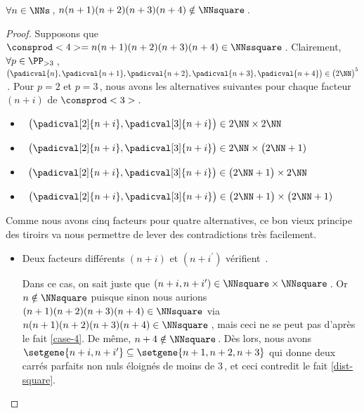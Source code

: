 \begin{fact} \label{case-5}
	 $\forall n \in \NNs$\,, $n(n+1)(n+2)(n+3)(n+4) \notin \NNsquare$\,.
\end{fact}




\begin{proof}
    Supposons que $\consprod<4> = n(n+1)(n+2)(n+3)(n+4) \in \NNssquare$\,.
    Clairement, $\forall p \in \PP_{>3}$\,, 
    $\big( \padicval{n} , \padicval{n + 1} , \padicval{n + 2} , \padicval{n + 3} , \padicval{n + 4} \big) \in \big( 2 \NN \big)^5$\,.
    Pour $p = 2$ et $p = 3$\,, nous avons les alternatives suivantes pour chaque facteur $(n+i)$ de $\consprod<3>$\,.
    \begin{itemize}
    	\smallskip
		\item {}\,
		$\big( \padicval[2]{n + i} , \padicval[3]{n + i} \big) \in 2 \NN \times 2 \NN$

    	\smallskip
		\item {}\,
		$\big( \padicval[2]{n + i} , \padicval[3]{n + i} \big) \in 2 \NN \times \big( 2 \NN + 1)$

    	\smallskip
		\item {}\,
		$\big( \padicval[2]{n + i} , \padicval[3]{n + i} \big) \in \big( 2 \NN + 1 \big) \times 2 \NN$

    	\smallskip
		\item {}\,
		$\big( \padicval[2]{n + i} , \padicval[3]{n + i} \big) \in \big( 2 \NN + 1 \big) \times \big( 2 \NN + 1)$
    \end{itemize}
    
    \medskip
    
    Comme nous avons cinq facteurs pour quatre alternatives, ce bon vieux principe des tiroirs va nous permettre de lever des contradictions très facilement.
    \begin{itemize}
    	\medskip
		\item Deux facteurs différents $(n+i)$ et $(n+i^\prime)$ vérifient \,.
		
		\smallskip
		\noindent
		Dans ce cas, on sait juste que $(n+i, n+i^\prime) \in \NNsquare \times \NNsquare$\,.
		Or $n \notin \NNsquare$ puisque sinon nous aurions $(n+1)(n+2)(n+3)(n+4) \in \NNsquare$ via $n(n+1)(n+2)(n+3)(n+4) \in \NNsquare$\,, mais ceci ne se peut pas d'après le fait \ref{case-4}.
		De même, $n+4 \notin \NNsquare$\,.
		Dès lors, nous avons $\setgene{n+i, n+i^\prime} \subseteq \setgene{n+1, n+2, n+3}$ qui donne deux carrés parfaits non nuls éloignés de moins de $3$\,, et ceci contredit le fait \ref{dist-square}.



\end{itemize}
\end{proof}
